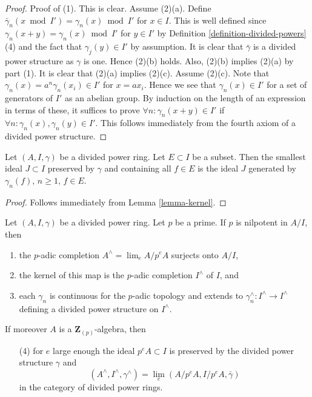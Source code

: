 \begin{proof}
Proof of (1). This is clear. Assume (2)(a). Define
$\bar\gamma_n(x \bmod I') = \gamma_n(x) \bmod I'$ for $x \in I$.
This is well defined since $\gamma_n(x + y) = \gamma_n(x) \bmod I'$
for $y \in I'$ by Definition \ref{definition-divided-powers} (4) and
the fact that $\gamma_j(y) \in I'$ by assumption. It is clear that
$\bar\gamma$ is a divided power structure as $\gamma$ is one.
Hence (2)(b) holds. Also, (2)(b) implies (2)(a) by part (1).
It is clear that (2)(a) implies (2)(c). Assume (2)(c).
Note that $\gamma_n(x) = a^n\gamma_n(x_i) \in I'$ for $x = ax_i$.
Hence we see that $\gamma_n(x) \in I'$ for a set of generators of $I'$
as an abelian group. By induction on the length of an expression in
terms of these, it suffices to prove $\forall n : \gamma_n(x + y) \in I'$
if $\forall n : \gamma_n(x), \gamma_n(y) \in I'$. This
follows immediately from the fourth axiom of a divided power structure.
\end{proof}

\begin{lemma}
\label{lemma-sub-dp-ideal}
Let $(A, I, \gamma)$ be a divided power ring.
Let $E \subset I$ be a subset.
Then the smallest ideal $J \subset I$ preserved by $\gamma$
and containing all $f \in E$ is the ideal $J$ generated by
$\gamma_n(f)$, $n \geq 1$, $f \in E$.
\end{lemma}

\begin{proof}
Follows immediately from Lemma \ref{lemma-kernel}.
\end{proof}

\begin{lemma}
\label{lemma-extend-to-completion}
Let $(A, I, \gamma)$ be a divided power ring. Let $p$ be a prime.
If $p$ is nilpotent in $A/I$, then
\begin{enumerate}
\item the $p$-adic completion $A^\wedge = \lim_e A/p^eA$ surjects onto $A/I$,
\item the kernel of this map is the $p$-adic completion $I^\wedge$ of $I$, and
\item each $\gamma_n$ is continuous for the $p$-adic topology and extends
to $\gamma_n^\wedge : I^\wedge \to I^\wedge$ defining a divided power
structure on $I^\wedge$.
\end{enumerate}
If moreover $A$ is a $\mathbf{Z}_{(p)}$-algebra, then
\begin{enumerate}
\item[(4)] for $e$ large enough the ideal $p^eA \subset I$ is preserved by the
divided power structure $\gamma$ and
$$
(A^\wedge, I^\wedge, \gamma^\wedge) = \lim_e (A/p^eA, I/p^eA, \bar\gamma)
$$
in the category of divided power rings.
\end{enumerate}
\end{lemma}

